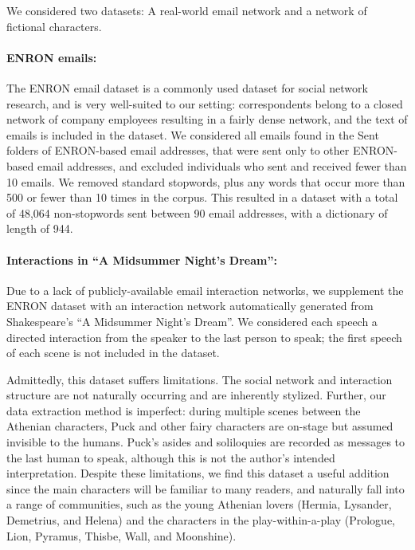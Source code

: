         We considered two datasets: A real-world email network and a network of fictional characters.
        
        \paragraph{ENRON emails:}
            The ENRON email dataset \citep{enron_paper} is a commonly used dataset for social network research, and is very well-suited to our setting: correspondents belong to a closed network of company employees resulting in a fairly dense network, and the text of emails is included in the dataset.  We considered all emails found in the Sent folders of ENRON-based email addresses, that were sent only to other ENRON-based email addresses, and excluded individuals who sent and received fewer than 10 emails. We removed standard stopwords, plus any words that occur more than 500 or fewer than 10 times in the corpus.  This resulted in a dataset with  a total of 48,064 non-stopwords sent between 90 email addresses, with a dictionary of length of 944.
    
        \paragraph{Interactions in ``A Midsummer Night's Dream'':} 
            Due to a lack of publicly-available email interaction networks, we supplement the ENRON dataset with an interaction network automatically generated from Shakespeare's ``A Midsummer Night's Dream''. We considered each speech a directed interaction from the speaker to the last person to speak; the first speech of each scene is not included in the dataset.
            
            Admittedly, this dataset suffers limitations. The social network and interaction structure are not naturally occurring and are inherently stylized. Further, our data extraction method is imperfect: during multiple scenes between the Athenian characters, Puck and other fairy characters are on-stage but assumed invisible to the humans. Puck's asides and soliloquies are recorded as messages to the last human to speak, although this is not the author's intended interpretation. Despite these limitations, we find this dataset a useful addition since the main characters will be familiar to many readers, and naturally fall into a range of communities, such as the young Athenian lovers (Hermia, Lysander, Demetrius, and Helena) and the characters  in the play-within-a-play (Prologue, Lion, Pyramus, Thisbe, Wall, and Moonshine).
            
